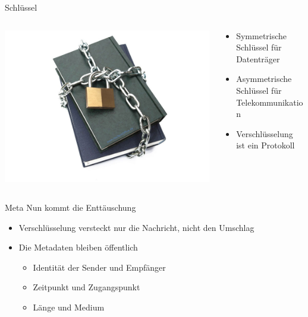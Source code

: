 \documentclass[aspectratio=1610]{beamer}
\begin{document}
  \begin{frame}{Schlüssel}
    \begin{columns}
      \begin{column}{.5\textwidth}
        \includegraphics[width=\textwidth]{security.jpg}
      \end{column}
      \begin{column}{.5\textwidth}
        \begin{itemize}
          \pause
          \item Symmetrische Schlüssel für Datenträger
          \pause
          \item Asymmetrische Schlüssel für Telekommunikation
          \pause
          \item Verschlüsselung ist ein Protokoll
        \end{itemize}
      \end{column}
    \end{columns}
  \end{frame}

  \begin{frame}{Meta}
    Nun kommt die Enttäuschung
    \begin{itemize}
      \pause
      \item Verschlüsselung versteckt nur die Nachricht, nicht den Umschlag
      \pause
      \item Die Metadaten bleiben öffentlich
        \begin{itemize}
          \pause
          \item Identität der Sender und Empfänger
          \pause
          \item Zeitpunkt und Zugangspunkt
          \pause
          \item Länge und Medium
        \end{itemize}
    \end{itemize}
  \end{frame}
\end{document}
